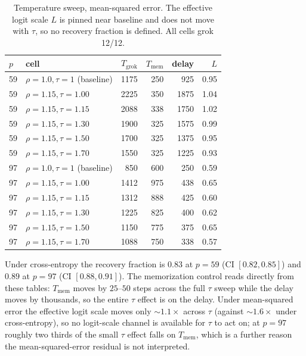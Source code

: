 \begin{table}[h]\centering\small
\caption{Temperature sweep, mean-squared error. The effective logit scale $L$ is pinned near baseline and
does not move with $\tau$, so no recovery fraction is defined. All cells grok 12/12.}
\label{tab:medmse}
\begin{tabular}{llrrrr}
\toprule
$p$ & cell & $T_{\mathrm{grok}}$ & $T_{\mathrm{mem}}$ & delay & $L$ \\
\midrule
59 & $\rho{=}1.0,\tau{=}1$ (baseline) & 1175 & 250 & 925 & 0.95 \\
59 & $\rho{=}1.15,\tau{=}1.00$ & 2225 & 350 & 1875 & 1.04 \\
59 & $\rho{=}1.15,\tau{=}1.15$ & 2088 & 338 & 1750 & 1.02 \\
59 & $\rho{=}1.15,\tau{=}1.30$ & 1900 & 325 & 1575 & 0.99 \\
59 & $\rho{=}1.15,\tau{=}1.50$ & 1700 & 325 & 1375 & 0.95 \\
59 & $\rho{=}1.15,\tau{=}1.70$ & 1550 & 325 & 1225 & 0.93 \\
\midrule
97 & $\rho{=}1.0,\tau{=}1$ (baseline) & 850 & 600 & 250 & 0.59 \\
97 & $\rho{=}1.15,\tau{=}1.00$ & 1412 & 975 & 438 & 0.65 \\
97 & $\rho{=}1.15,\tau{=}1.15$ & 1312 & 888 & 425 & 0.60 \\
97 & $\rho{=}1.15,\tau{=}1.30$ & 1225 & 825 & 400 & 0.62 \\
97 & $\rho{=}1.15,\tau{=}1.50$ & 1150 & 775 & 375 & 0.65 \\
97 & $\rho{=}1.15,\tau{=}1.70$ & 1088 & 750 & 338 & 0.57 \\
\bottomrule
\end{tabular}
\end{table}

Under cross-entropy the recovery fraction is $0.83$ at $p=59$ (CI $[0.82,0.85]$) and $0.89$ at $p=97$
(CI $[0.88,0.91]$). The memorization control reads directly from these tables: $T_{\mathrm{mem}}$ moves by
$25$--$50$ steps across the full $\tau$ sweep while the delay moves by thousands, so the entire $\tau$
effect is on the delay. Under mean-squared error the effective logit scale moves only $\sim 1.1\times$
across $\tau$ (against $\sim 1.6\times$ under cross-entropy), so no logit-scale channel is available for
$\tau$ to act on; at $p=97$ roughly two thirds of the small $\tau$ effect falls on $T_{\mathrm{mem}}$,
which is a further reason the mean-squared-error residual is not interpreted.

